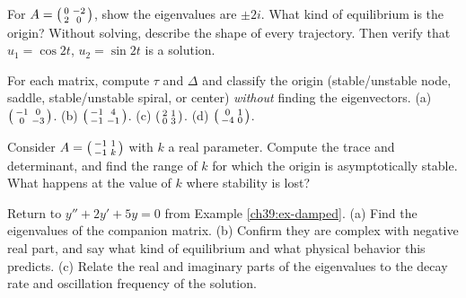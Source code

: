 \begin{exercise}
For $A = \begin{psmallmatrix} 0 & -2 \\ 2 & 0\end{psmallmatrix}$, show the
eigenvalues are $\pm 2i$. What kind of equilibrium is the origin? Without solving,
describe the shape of every trajectory. Then verify that $u_1 = \cos 2t$, $u_2 =
\sin 2t$ is a solution.
\end{exercise}

\begin{exercise}
For each matrix, compute $\tau$ and $\Delta$ and classify the origin
(stable/unstable node, saddle, stable/unstable spiral, or center) \emph{without}
finding the eigenvectors. (a) $\begin{psmallmatrix} -1 & 0 \\ 0 &
-3\end{psmallmatrix}$. (b) $\begin{psmallmatrix} -1 & 4 \\ -1 &
-1\end{psmallmatrix}$. (c) $\begin{psmallmatrix} 2 & 1 \\ 0 &
3\end{psmallmatrix}$. (d) $\begin{psmallmatrix} 0 & 1 \\ -4 &
0\end{psmallmatrix}$.
\end{exercise}

\begin{exercise}
Consider $A = \begin{psmallmatrix} -1 & 1 \\ -1 & k\end{psmallmatrix}$ with $k$
a real parameter. Compute the trace and determinant, and find the range of $k$
for which the origin is asymptotically stable. What happens at the value of $k$
where stability is lost?
\end{exercise}

\begin{exercise}
Return to $y'' + 2y' + 5y = 0$ from Example \ref{ch39:ex-damped}. (a) Find the
eigenvalues of the companion matrix. (b) Confirm they are complex with negative
real part, and say what kind of equilibrium and what physical behavior this
predicts. (c) Relate the real and imaginary parts of the eigenvalues to the decay
rate and oscillation frequency of the solution.
\end{exercise}

